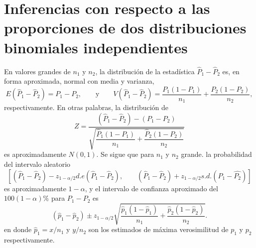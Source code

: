 \section{Inferencias con respecto a las proporciones de dos distribuciones binomiales independientes}
En valores grandes de $n_1$ y $n_2$, la distribución de la estadística $\hat{P}_1-\hat{P}_2$ es, en forma aproximada, normal con media y varianza,  
$$E(\hat{P}_1-\hat{P}_2)=P_1-P_2,\qquad \mbox{y} \qquad V(\hat{P}_1-\hat{P}_2)=\dfrac{P_1(1-P_1)}{n_1}+\dfrac{P_2(1-P_2)}{n_2},$$
respectivamente. En otras palabras, la distribución de
$$Z=\dfrac{(\hat{P}_1-\hat{P}_2)-(P_1-P_2)}{\sqrt{\dfrac{\hat{P}_1(1-P_1)}{n_1}+\dfrac{\hat{P}_2(1-P_2)}{n_2}}}$$
es aproximadamente $N(0,1)$. Se sigue que para $n_1$ y $n_2$ grande. la probabilidad del intervalo aleatorio
$$\left[\left(\hat{P}_1-\hat{P}_2\right)-z_{1-\alpha/2} d.e\left(\hat{P}_1-\hat{P}_2\right), \qquad \left(\hat{P}_1-\hat{P}_2\right)+z_{1-\alpha/2} s.d. \left(\hat{P}_1-\hat{P_2}\right)\right]$$
es aproximadamente $1-\alpha$, y el intervalo de confianza aproximado del $100(1-\alpha)\%$ para $P_1-P_2$ es
$$\left(\hat{p}_1-\hat{p}_2\right)\pm z_{1-\alpha/2} \sqrt{\dfrac{\hat{p}_1(1-\hat{p}_1)}{n_1}+\dfrac{\hat{p}_2(1-\hat{p}_2)}{n_2}}.$$
en donde $\hat{p}_1=x/n_1$ y $y/n_2$ son los estimados de máxima verosimilitud de $p_1$ y $p_2$ respectivamente.
